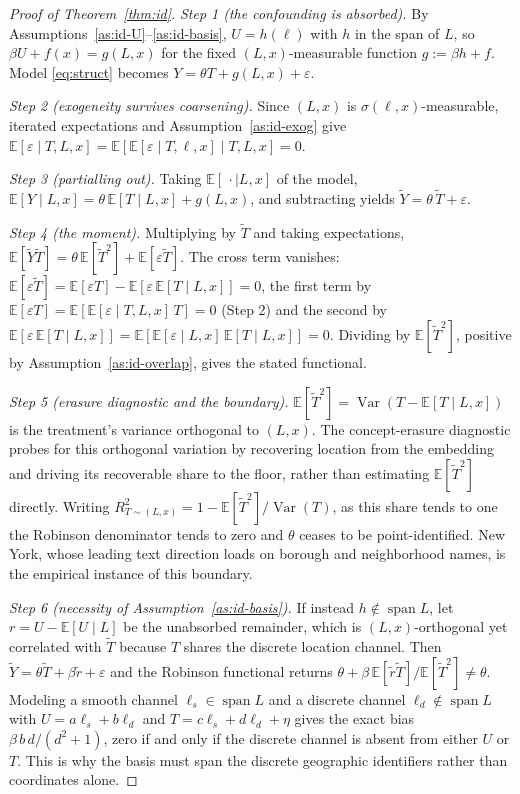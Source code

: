 \begin{proof}[Proof of Theorem~\ref{thm:id}]
\emph{Step 1 (the confounding is absorbed).} By
Assumptions~\ref{as:id-U}--\ref{as:id-basis}, $U=h(\ell)$ with $h$ in the span of
$L$, so $\beta U+f(x)=g(L,x)$ for the fixed $(L,x)$-measurable function
$g:=\beta h+f$. Model \eqref{eq:struct} becomes $Y=\theta T+g(L,x)+\varepsilon$.

\emph{Step 2 (exogeneity survives coarsening).} Since $(L,x)$ is
$\sigma(\ell,x)$-measurable, iterated expectations and
Assumption~\ref{as:id-exog} give
$\mathbb{E}[\varepsilon\mid T,L,x]=\mathbb{E}\!\left[\mathbb{E}[\varepsilon\mid
T,\ell,x]\mid T,L,x\right]=0$.

\emph{Step 3 (partialling out).} Taking $\mathbb{E}[\,\cdot\mid L,x]$ of the model,
$\mathbb{E}[Y\mid L,x]=\theta\,\mathbb{E}[T\mid L,x]+g(L,x)$, and subtracting yields
$\tilde Y=\theta\,\tilde T+\varepsilon$.

\emph{Step 4 (the moment).} Multiplying by $\tilde T$ and taking expectations,
$\mathbb{E}[\tilde Y\tilde T]=\theta\,\mathbb{E}[\tilde T^{2}]+\mathbb{E}[\varepsilon
\tilde T]$. The cross term vanishes: $\mathbb{E}[\varepsilon\tilde
T]=\mathbb{E}[\varepsilon T]-\mathbb{E}[\varepsilon\,\mathbb{E}[T\mid L,x]]=0$, the
first term by $\mathbb{E}[\varepsilon T]=\mathbb{E}[\mathbb{E}[\varepsilon\mid
T,L,x]\,T]=0$ (Step 2) and the second by
$\mathbb{E}[\varepsilon\,\mathbb{E}[T\mid L,x]]=\mathbb{E}[\mathbb{E}[\varepsilon\mid
L,x]\,\mathbb{E}[T\mid L,x]]=0$. Dividing by $\mathbb{E}[\tilde T^{2}]$, positive by
Assumption~\ref{as:id-overlap}, gives the stated functional.

\emph{Step 5 (erasure diagnostic and the boundary).} $\mathbb{E}[\tilde
T^{2}]=\operatorname{Var}(T-\mathbb{E}[T\mid L,x])$ is the treatment's variance
orthogonal to $(L,x)$. The concept-erasure diagnostic probes for this orthogonal
variation by recovering location from the embedding and driving its recoverable share
to the floor, rather than estimating $\mathbb{E}[\tilde T^{2}]$ directly. Writing
$R^2_{T\sim(L,x)}=1-\mathbb{E}[\tilde
T^{2}]/\operatorname{Var}(T)$, as this share tends to one the Robinson denominator
tends to zero and $\theta$ ceases to be point-identified. New York, whose leading
text direction loads on borough and neighborhood names, is the empirical instance of
this boundary.

\emph{Step 6 (necessity of Assumption~\ref{as:id-basis}).} If instead
$h\notin\operatorname{span}L$, let $r=U-\mathbb{E}[U\mid L]$ be the unabsorbed
remainder, which is $(L,x)$-orthogonal yet correlated with $\tilde T$ because $T$
shares the discrete location channel. Then $\tilde Y=\theta\tilde T+\beta\tilde
r+\varepsilon$ and the Robinson functional returns $\theta+\beta\,\mathbb{E}[\tilde
r\tilde T]/\mathbb{E}[\tilde T^{2}]\neq\theta$. Modeling a smooth channel
$\ell_s\in\operatorname{span}L$ and a discrete channel $\ell_d\notin
\operatorname{span}L$ with $U=a\ell_s+b\ell_d$ and $T=c\ell_s+d\ell_d+\eta$ gives the
exact bias $\beta\,b\,d/(d^{2}+1)$, zero if and only if the discrete channel is
absent from either $U$ or $T$. This is why the basis must span the discrete
geographic identifiers rather than coordinates alone.
\end{proof}

